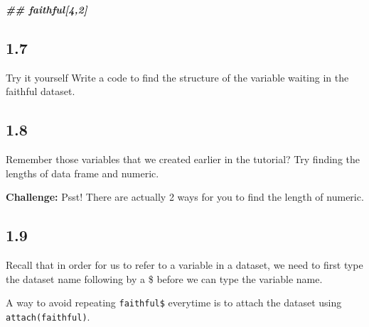 \documentclass[
]{book}
\newenvironment{Shaded}{\begin{snugshade}}{\end{snugshade}}
\newcommand{\DocumentationTok}[1]{\textcolor[rgb]{0.56,0.35,0.01}{\textbf{\textit{#1}}}}
\begin{document}
\begin{Shaded}
\begin{Highlighting}[]
\DocumentationTok{\#\# faithful[4,2]}
\end{Highlighting}
\end{Shaded}

\hypertarget{section-6}{%
\subsection{1.7}\label{section-6}}

Try it yourself
Write a code to find the structure of the variable waiting in the faithful dataset.

\begin{Shaded}
\end{Shaded}

\hypertarget{section-7}{%
\subsection{1.8}\label{section-7}}

Remember those variables that we created earlier in the tutorial? Try finding the lengths of data frame and numeric.

\textbf{Challenge:} Psst! There are actually 2 ways for you to find the length of numeric.

\begin{Shaded}
\end{Shaded}

\hypertarget{section-8}{%
\subsection{1.9}\label{section-8}}

Recall that in order for us to refer to a variable in a dataset, we need to first type the dataset name following by a \$ before we can type the variable name.

A way to avoid repeating \texttt{faithful\$} everytime is to attach the dataset using \texttt{attach(faithful)}.
\end{document}
